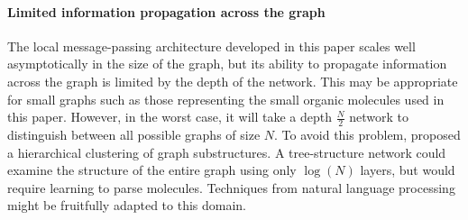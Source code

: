 \documentclass{article}
\begin{document}
\paragraph{Limited information propagation across the graph}
The local message-passing architecture developed in this paper scales well asymptotically in the size of the graph, but its ability to propagate information across the graph is limited by the depth of the network.
This may be appropriate for small graphs such as those representing the small organic molecules used in this paper.
However, in the worst case, it will take a depth $\frac{N}{2}$ network to distinguish between all possible graphs of size $N$.
To avoid this problem, \citet{bruna2013spectral} proposed a hierarchical clustering of graph substructures.
A tree-structure network could examine the structure of the entire graph using only $\log(N)$ layers, but would require learning to parse molecules.
Techniques from natural language processing~\citep{tai2015improved} might be fruitfully adapted to this domain.






\end{document}
